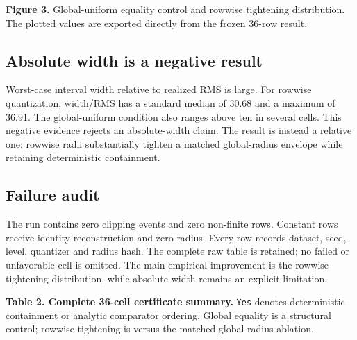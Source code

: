 \documentclass{article}
\begin{document}
\textbf{Figure 3.} Global-uniform equality control and rowwise tightening distribution. The plotted values are exported directly from the frozen 36-row result.

\subsection{Absolute width is a negative result}


Worst-case interval width relative to realized RMS is large. For rowwise quantization, width/RMS has a standard median of 30.68 and a maximum of 36.91. The global-uniform condition also ranges above ten in several cells. This negative evidence rejects an absolute-width claim. The result is instead a relative one: rowwise radii substantially tighten a matched global-radius envelope while retaining deterministic containment.

\subsection{Failure audit}


The run contains zero clipping events and zero non-finite rows. Constant rows receive identity reconstruction and zero radius. Every row records dataset, seed, level, quantizer and radius hash. The complete raw table is retained; no failed or unfavorable cell is omitted. The main empirical improvement is the rowwise tightening distribution, while absolute width remains an explicit limitation.

\textbf{Table 2. Complete 36-cell certificate summary.} \texttt{Yes} denotes deterministic containment or analytic comparator ordering. Global equality is a structural control; rowwise tightening is versus the matched global-radius ablation.
\end{document}
